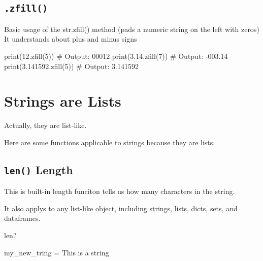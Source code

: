 \documentclass[
  letterpaper,
  DIV=11,
  numbers=noendperiod]{scrreprt}
\newenvironment{Shaded}{\begin{snugshade}}{\end{snugshade}}
\newcommand{\BuiltInTok}[1]{\textcolor[rgb]{0.00,0.23,0.31}{#1}}
\newcommand{\CommentTok}[1]{\textcolor[rgb]{0.37,0.37,0.37}{#1}}
\newcommand{\DecValTok}[1]{\textcolor[rgb]{0.68,0.00,0.00}{#1}}
\newcommand{\NormalTok}[1]{\textcolor[rgb]{0.00,0.23,0.31}{#1}}
\newcommand{\OperatorTok}[1]{\textcolor[rgb]{0.37,0.37,0.37}{#1}}
\newcommand{\StringTok}[1]{\textcolor[rgb]{0.13,0.47,0.30}{#1}}
\begin{document}
\hypertarget{zfill}{%
\section{\texorpdfstring{\texttt{.zfill()}}{.zfill()}}\label{zfill}}

Basic usage of the str.zfill() method (pads a numeric string on the left
with zeros) It understands about plus and minus signs

\begin{Shaded}
\begin{Highlighting}[]
\BuiltInTok{print}\NormalTok{(}\StringTok{\textquotesingle{}12\textquotesingle{}}\NormalTok{.zfill(}\DecValTok{5}\NormalTok{))       }\CommentTok{\# Output: 00012}
\BuiltInTok{print}\NormalTok{(}\StringTok{\textquotesingle{}{-}3.14\textquotesingle{}}\NormalTok{.zfill(}\DecValTok{7}\NormalTok{))    }\CommentTok{\# Output: {-}003.14}
\BuiltInTok{print}\NormalTok{(}\StringTok{\textquotesingle{}3.141592\textquotesingle{}}\NormalTok{.zfill(}\DecValTok{5}\NormalTok{)) }\CommentTok{\# Output: 3.141592}
\end{Highlighting}
\end{Shaded}

\hypertarget{strings-are-lists}{%
\chapter{Strings are Lists}\label{strings-are-lists}}

Actually, they are list-like.

Here are some functions applicable to strings because they are lists.

\hypertarget{len-length}{%
\section{\texorpdfstring{\texttt{len()}
Length}{len() Length}}\label{len-length}}

This is built-in length funciton tells us how many characters in the
string.

It also applys to any list-like object, including strings, lists, dicts,
sets, and dataframes.

\begin{Shaded}
\begin{Highlighting}[]
\BuiltInTok{len}\NormalTok{?}
\end{Highlighting}
\end{Shaded}

\begin{Shaded}
\begin{Highlighting}[]
\NormalTok{my\_new\_tring }\OperatorTok{=} \StringTok{\textquotesingle{}This is a string\textquotesingle{}}
\end{Highlighting}
\end{Shaded}
\end{document}
